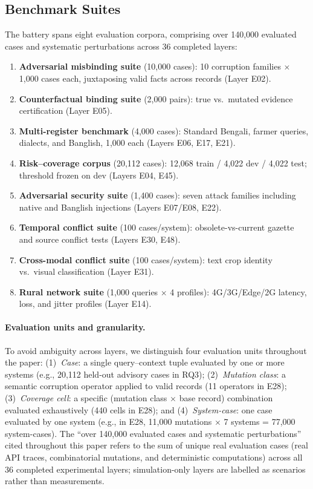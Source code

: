 \subsection{Benchmark Suites}
The battery spans eight evaluation corpora, comprising over 140{,}000 evaluated cases and systematic perturbations across 36 completed layers:
\begin{enumerate}
    \item \textbf{Adversarial misbinding suite} (10,000 cases): 10 corruption families $\times$ 1{,}000 cases each, juxtaposing valid facts across records (Layer E02).
    \item \textbf{Counterfactual binding suite} (2,000 pairs): true vs.\ mutated evidence certification (Layer E05).
    \item \textbf{Multi-register benchmark} (4,000 cases): Standard Bengali, farmer queries, dialects, and Banglish, 1{,}000 each (Layers E06, E17, E21).
    \item \textbf{Risk--coverage corpus} (20{,}112 cases): 12{,}068 train / 4{,}022 dev / 4{,}022 test; threshold frozen on dev (Layers E04, E45).
    \item \textbf{Adversarial security suite} (1{,}400 cases): seven attack families including native and Banglish injections (Layers E07/E08, E22).
    \item \textbf{Temporal conflict suite} (100 cases/system): obsolete-vs-current gazette and source conflict tests (Layers E30, E48).
    \item \textbf{Cross-modal conflict suite} (100 cases/system): text crop identity vs.\ visual classification (Layer E31).
    \item \textbf{Rural network suite} (1{,}000 queries $\times$ 4 profiles): 4G/3G/Edge/2G latency, loss, and jitter profiles (Layer E14).
\end{enumerate}

\paragraph{Evaluation units and granularity.} To avoid ambiguity across layers, we distinguish four evaluation units throughout the paper: (1)~\emph{Case}: a single query--context tuple evaluated by one or more systems (e.g., 20,112 held-out advisory cases in RQ3); (2)~\emph{Mutation class}: a semantic corruption operator applied to valid records (11 operators in E28); (3)~\emph{Coverage cell}: a specific (mutation class $\times$ base record) combination evaluated exhaustively (440 cells in E28); and (4)~\emph{System-case}: one case evaluated by one system (e.g., in E28, 11{,}000 mutations $\times$ 7 systems = 77{,}000 system-cases). The ``over 140{,}000 evaluated cases and systematic perturbations'' cited throughout this paper refers to the sum of unique real evaluation cases (real API traces, combinatorial mutations, and deterministic computations) across all 36 completed experimental layers; simulation-only layers are labelled as scenarios rather than measurements.

